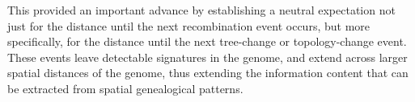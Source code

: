 \documentclass[11pt]{article}
\begin{document}
This provided an important advance by establishing a neutral expectation 
not just for the distance until the next recombination event occurs, 
but more specifically, for the distance until the next tree-change or 
topology-change event. These events leave 
detectable signatures in the genome, and extend across larger 
spatial distances of the genome, thus extending the information content
that can be extracted from spatial genealogical patterns.%






\end{document}
